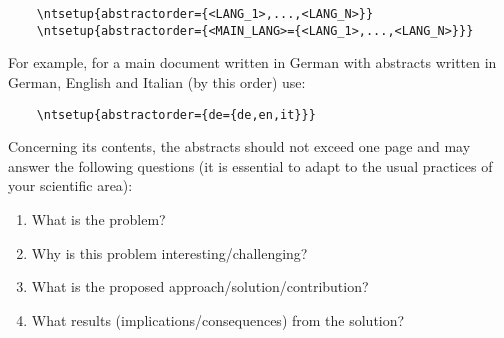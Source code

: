 %

\begin{verbatim}
    \ntsetup{abstractorder={<LANG_1>,...,<LANG_N>}}
    \ntsetup{abstractorder={<MAIN_LANG>={<LANG_1>,...,<LANG_N>}}}
\end{verbatim}

For example, for a main document written in German with abstracts written in German, English and Italian (by this order) use:
\begin{verbatim}
    \ntsetup{abstractorder={de={de,en,it}}}
\end{verbatim}

Concerning its contents, the abstracts should not exceed one page and may answer the following questions (it is essential to adapt to the usual practices of your scientific area):

\begin{enumerate}
  \item What is the problem?
  \item Why is this problem interesting/challenging?
  \item What is the proposed approach/solution/contribution?
  \item What results (implications/consequences) from the solution?
\end{enumerate}

